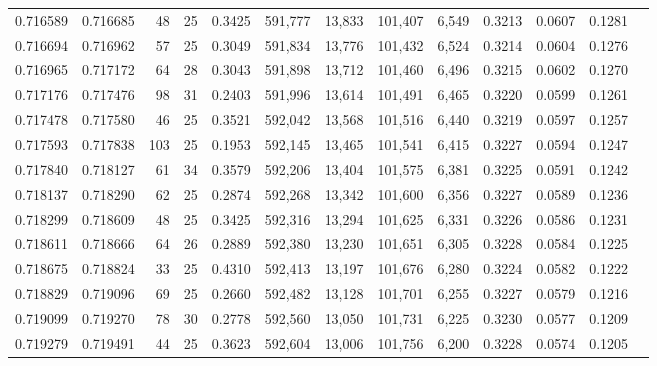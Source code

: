 \begin{tabular}{rrrrrrrrrrrrr}
0.716589 & 0.716685 &  48 &  25 &                                     0.3425 & 591,777 &  13,833 & 101,407 &   6,549 & 0.3213 & 0.0607 & 0.1281 \\
0.716694 & 0.716962 &  57 &  25 &                                     0.3049 & 591,834 &  13,776 & 101,432 &   6,524 & 0.3214 & 0.0604 & 0.1276 \\
0.716965 & 0.717172 &  64 &  28 &                                     0.3043 & 591,898 &  13,712 & 101,460 &   6,496 & 0.3215 & 0.0602 & 0.1270 \\
0.717176 & 0.717476 &  98 &  31 &                                     0.2403 & 591,996 &  13,614 & 101,491 &   6,465 & 0.3220 & 0.0599 & 0.1261 \\
0.717478 & 0.717580 &  46 &  25 &                                     0.3521 & 592,042 &  13,568 & 101,516 &   6,440 & 0.3219 & 0.0597 & 0.1257 \\
0.717593 & 0.717838 & 103 &  25 &                                     0.1953 & 592,145 &  13,465 & 101,541 &   6,415 & 0.3227 & 0.0594 & 0.1247 \\
0.717840 & 0.718127 &  61 &  34 &                                     0.3579 & 592,206 &  13,404 & 101,575 &   6,381 & 0.3225 & 0.0591 & 0.1242 \\
0.718137 & 0.718290 &  62 &  25 &                                     0.2874 & 592,268 &  13,342 & 101,600 &   6,356 & 0.3227 & 0.0589 & 0.1236 \\
0.718299 & 0.718609 &  48 &  25 &                                     0.3425 & 592,316 &  13,294 & 101,625 &   6,331 & 0.3226 & 0.0586 & 0.1231 \\
0.718611 & 0.718666 &  64 &  26 &                                     0.2889 & 592,380 &  13,230 & 101,651 &   6,305 & 0.3228 & 0.0584 & 0.1225 \\
0.718675 & 0.718824 &  33 &  25 &                                     0.4310 & 592,413 &  13,197 & 101,676 &   6,280 & 0.3224 & 0.0582 & 0.1222 \\
0.718829 & 0.719096 &  69 &  25 &                                     0.2660 & 592,482 &  13,128 & 101,701 &   6,255 & 0.3227 & 0.0579 & 0.1216 \\
0.719099 & 0.719270 &  78 &  30 &                                     0.2778 & 592,560 &  13,050 & 101,731 &   6,225 & 0.3230 & 0.0577 & 0.1209 \\
0.719279 & 0.719491 &  44 &  25 &                                     0.3623 & 592,604 &  13,006 & 101,756 &   6,200 & 0.3228 & 0.0574 & 0.1205 \\

\end{tabular}
